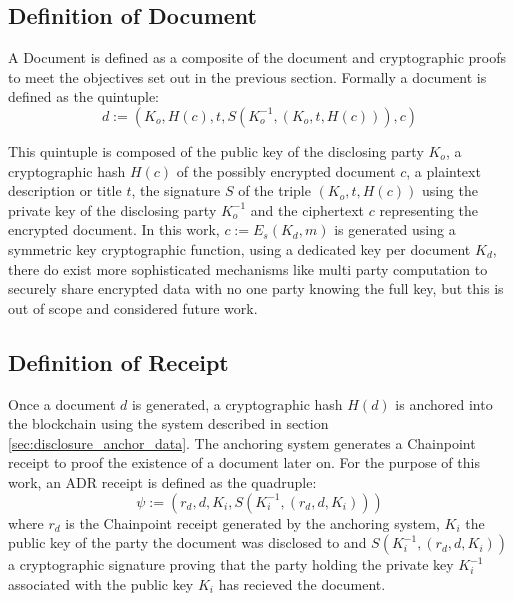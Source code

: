 \documentclass[12pt,msc,a4paper,oneside]{ucl_thesis}
\begin{document}
\subsection{Definition of Document} \label{sec:definition_of_document}
A Document is defined as a composite of the document and cryptographic proofs to meet the objectives set out in the previous section. Formally a document is defined as the quintuple:
\begin{equation}
    d := (K_o, H(c), t, S(K_o^{-1}, (K_o, t, H(c))), c)
    \label{eq:disclosure_document}
\end{equation}

This quintuple is composed of the public key of the disclosing party $K_o$, a cryptographic hash $H(c)$ of the possibly encrypted document $c$, a plaintext description or title $t$, the signature $S$ of the triple $(K_o, t, H(c))$ using the private key of the disclosing party $K_o^{-1}$ and the ciphertext $c$ representing the encrypted document. In this work, $c := E_s(K_d, m)$ is generated using a symmetric key cryptographic function, using a dedicated key per document $K_d$, there do exist more sophisticated mechanisms like multi party computation to securely share encrypted data with no one party knowing the full key, but this is out of scope and considered future work.

\subsection{Definition of Receipt} \label{sec:definition_of_receipt}
Once a document $d$ is generated, a cryptographic hash $H(d)$ is anchored into the blockchain using the system described in section \ref{sec:disclosure_anchor_data}. The anchoring system generates a Chainpoint receipt to proof the existence of a document later on. For the purpose of this work, an ADR receipt is defined as the quadruple:
\begin{equation}
    \psi := (r_d, d, K_i, S(K_i^{-1}, (r_d, d, K_i)))
    \label{eq:disclosure_receipt}
\end{equation}
where $r_d$ is the Chainpoint receipt generated by the anchoring system, $K_i$ the public key of the party the document was disclosed to and $S(K_i^{-1}, (r_d, d, K_i))$ a cryptographic signature proving that the party holding the private key $K_i^{-1}$ associated with the public key $K_i$ has recieved the document.
\end{document}
